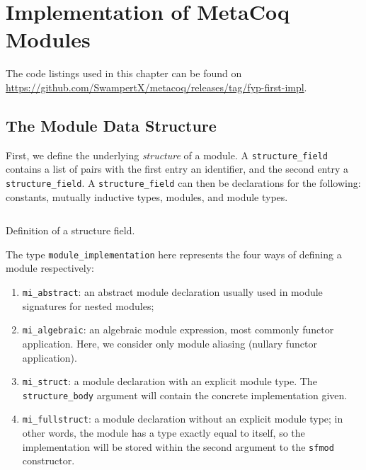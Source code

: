 \chapter{Implementation of MetaCoq Modules}
The code listings used in this chapter can be found on
\url{https://github.com/SwampertX/metacoq/releases/tag/fyp-first-impl}.
\label{ch:impl1}
\newcommand{\tc}[3]{
  \inputminted[firstline={#1},lastline={#2},linenos]{Coq}{code/v1/template-coq/theories/#3}
  }

\newcommand{\pcuic}[3]{\inputminted[firstline={#1},lastline={#2},linenos]{Coq}{
code/v1/pcuic/theories/#3}}


\section{The Module Data Structure}

First, we define the underlying \emph{structure} of a module. A
\verb|structure_field| contains a list of pairs with the first entry an
identifier, and the second entry a \verb|structure_field|. A
\verb|structure_field| can then be declarations for the following: constants,
mutually inductive types, modules, and module types.

\begin{listing}[H]
  \tc{324}{336}{Environment.v}
  \caption{Definition of a structure field.}
  \label{lst:1-def-sf}
\end{listing}

The type \verb|module_implementation| here represents the four ways of defining
a module respectively:
\begin{enumerate}
  \item \verb|mi_abstract|: an abstract module declaration usually used in
  module signatures for nested modules;
  \item \verb|mi_algebraic|: an algebraic module expression, most commonly
  functor application. Here, we consider only module aliasing (nullary functor
  application).
  \item \verb|mi_struct|: a module declaration with an explicit module type. The
  \verb|structure_body| argument will contain the concrete implementation given.
  \item \verb|mi_fullstruct|: a module declaration without an explicit module
  type; in other words, the module has a type exactly equal to itself, so the
  implementation will be stored within the second argument to the \verb|sfmod|
  constructor.
\end{enumerate}

